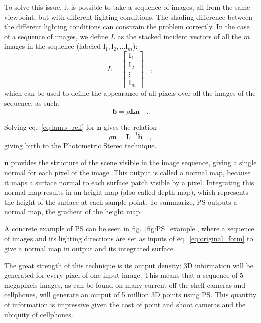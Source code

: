 \documentclass{report}
\begin{document}
To solve this issue, it is possible to take a sequence of images, all from the same viewpoint, but with different lighting conditions. The shading difference between the different lighting conditions can constrain the problem correctly. In the case of a sequence of images, we define $L$ as the stacked incident vectors of all the $m$ images in the sequence (labeled $\mathbf{l}_{1}, \mathbf{l}_{2}, \dots \mathbf{l}_{m}$):
\begin{equation}
L =
\begin{bmatrix}
    \mathbf{l}_{1} \\
    \mathbf{l}_{2} \\
    \vdots \\
    \mathbf{l}_{m}
\end{bmatrix}
\quad,
\end{equation}
which can be used to define the appearance of all pixels over all the images of the sequence, as such:
\begin{equation}
\label{eq:lamb_refl}
\mathbf{b} =  \rho \mathbf{L} \mathbf{n} \quad.
\end{equation}

Solving eq.~\eqref{eq:lamb_refl} for $\mathbf{n}$ gives the relation
\begin{equation}
\label{eq:original_form}
\rho \mathbf{n} =  \mathbf{L}^{-1} \mathbf{b} \quad,
\end{equation}
giving birth to the Photometric Stereo technique.

$\mathbf{n}$ provides the structure of the scene visible in the image sequence, giving a single normal for each pixel of the image. This output is called a normal map, because it maps a surface normal to each surface patch visible by a pixel. Integrating this normal map results in an height map (also called depth map), which represents the height of the surface at each sample point. To summarize, PS outputs a normal map, the gradient of the height map.

A concrete example of PS can be seen in fig.~\ref{fig:PS_example}, where a sequence of images and its lighting directions are set as inputs of eq.~\eqref{eq:original_form} to give a normal map in output and its integrated surface.

The great strength of this technique is its output density: 3D information will be generated for every pixel of one input image. This means that a sequence of 5 megapixels images, as can be found on many current off-the-shelf cameras and cellphones, will generate an output of 5 million 3D points using PS. This quantity of information is impressive given the cost of point and shoot cameras and the ubiquity of cellphones.
\end{document}
